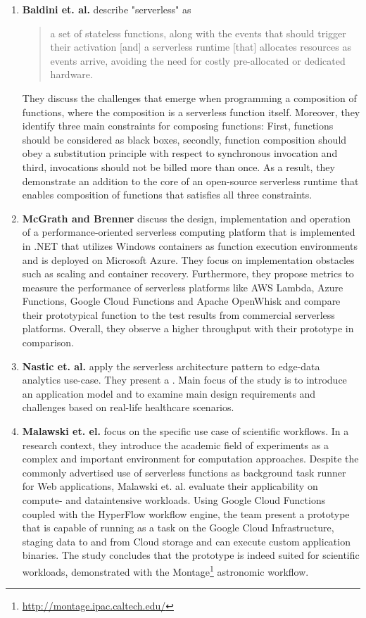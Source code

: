 \begin{enumerate}
    \item 
        \textbf{Baldini et. al.} describe "serverless" as \blockquote{a set of stateless functions, along with the events that should trigger their activation [and] a serverless runtime [that] allocates resources as events arrive, avoiding the need for costly pre-allocated or dedicated hardware.} They discuss the challenges that emerge when programming a composition of functions, where the composition is a serverless function itself. Moreover, they identify three main constraints for composing functions: First, functions should be considered as black boxes, secondly, function composition should obey a substitution principle with respect to synchronous invocation and third,  invocations should not be billed more than once. As a result, they demonstrate an addition to the core of an open-source serverless runtime that enables composition of functions that satisfies all three constraints.\autocite{Baldini2017TheComputing}
    \item
        \textbf{McGrath and Brenner} discuss the design, implementation and operation of a performance-oriented serverless computing platform that is implemented in .NET that utilizes Windows containers as function execution environments and is deployed on Microsoft Azure. They focus on implementation obstacles such as scaling and container recovery. Furthermore, they propose metrics to measure the performance of serverless platforms like AWS Lambda, Azure Functions, Google Cloud Functions and Apache OpenWhisk and compare their prototypical function to the test results from commercial serverless platforms. Overall, they observe a higher throughput with their prototype in comparison.\autocite{McGrath2017ServerlessPerformance}
    \item 
        \textbf{Nastic et. al.} apply the serverless architecture pattern to edge-data analytics use-case. They present a . Main focus of the study is to introduce an application model and to examine main design requirements and challenges based on real-life healthcare scenarios.\autocite{Nastic2017AComputing}
    \item 
        \textbf{Malawski et. el.} focus on the specific use case of scientific workflows. In a research context, they introduce the academic field of experiments as a complex and important environment for computation approaches. Despite the commonly advertised use of serverless functions as background task runner for Web applications, Malawski et. al. evaluate their applicability on compute- and dataintensive workloads. Using Google Cloud Functions coupled with the HyperFlow workflow engine, the team present a prototype that is capable of running as a task on the Google Cloud Infrastructure, staging data to and from Cloud storage and can execute custom application binaries. The study concludes that the prototype is indeed suited for scientific workloads, demonstrated with the Montage\footnote{\url{http://montage.ipac.caltech.edu/}} astronomic workflow.\autocite{Malawski2017ServerlessFunctions}

\end{enumerate}
